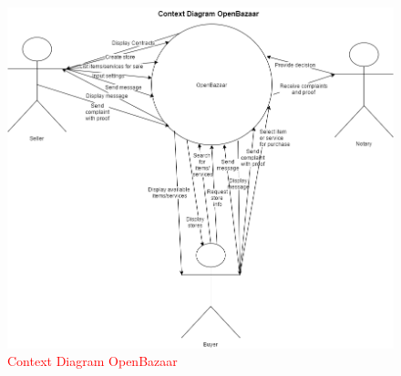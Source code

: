 \documentclass{article}
\begin{document}
\begin{figure}[h!]
\includegraphics[scale=0.5]{ContextDiagramOpenBazaar}
\caption{\textcolor{red}{Context Diagram OpenBazaar}}
\end{figure}
\newpage
{}
\listoffigures
{}
\listoftables
\end{document}
